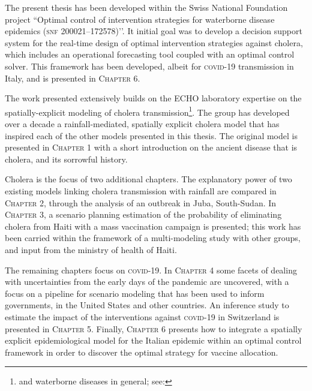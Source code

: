 The present thesis has been developed within the Swiss National Foundation project ``Optimal control of intervention strategies for waterborne disease epidemics (\textsc{snf} 200021–172578)’’. It initial goal was to develop a decision support system for the real-time design of optimal intervention strategies against cholera, which includes an operational forecasting tool coupled with an optimal control solver. This framework has been developed, albeit for \textsc{covid}-19 transmission in Italy, and is presented in \textsc{Chapter 6}. 


The work presented extensively builds on the ECHO laboratory expertise on the spatially-explicit modeling of cholera transmission\footnote{and waterborne diseases in general; see: }. The group has developed over a decade a rainfall-mediated, spatially explicit cholera model that has inspired each of the other models presented in this thesis. The original model is presented in \textsc{Chapter 1} with a short introduction on the ancient disease that is cholera, and its sorrowful history.

Cholera is the focus of two additional chapters. The explanatory power of two existing models linking cholera transmission with rainfall are compared in \textsc{Chapter 2}, through the analysis of an outbreak in Juba, South-Sudan. In \textsc{Chapter 3}, a scenario planning estimation of the probability of eliminating cholera from Haiti with a mass vaccination campaign is presented; this work has been carried within the framework of a multi-modeling study with other groups, and input from the ministry of health of Haiti.

The remaining chapters focus on \textsc{covid}-19. In \textsc{Chapter 4} some facets of dealing with uncertainties from the early days of the pandemic are uncovered, with a focus on a pipeline for scenario modeling that has been used to inform governments, in the United States and other countries. 
An inference study to estimate the impact of the interventions against \textsc{covid}-19 in Switzerland is presented in \textsc{Chapter 5}.
Finally, \textsc{Chapter 6} presents how to integrate a spatially explicit epidemiological model for the Italian epidemic within an optimal control framework in order to discover the optimal strategy for vaccine allocation.



